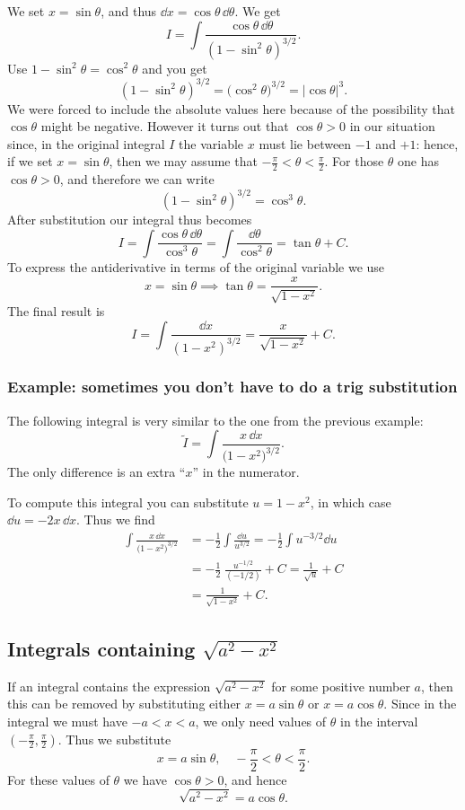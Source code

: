 We set $x=\sin\theta$, and thus $\dd x=\cos \theta\, \dd\theta$.  We get
\[
I = \int\frac{\cos \theta \, \dd\theta}{(1-\sin^2\theta)^{3/2}}.
\]
Use $1-\sin^2\theta = \cos^2 \theta$ and you get
\[
(1-\sin^2\theta)^{3/2} = \bigl(\cos^2\theta\bigr)^{3/2} = |\cos \theta|^3.
\]
We were forced to include the absolute values here because of the possibility
that $\cos\theta$ might be negative.  However it turns out that $\cos \theta>0$
in our situation since, in the original integral $I$ the variable $x$ must lie
between $-1$ and $+1$: hence, if we set $x=\sin\theta$, then we may assume that
$-\frac\pi2 < \theta < \frac\pi2$.  For those $\theta$ one has $\cos \theta>0$,
and therefore we can write
\[
(1-\sin^2\theta)^{3/2} = \cos^3 \theta.
\]
After substitution our integral thus becomes
\[
I = \int \frac{\cos \theta \, \dd\theta}{\cos^3\theta}
=\int\frac{\dd\theta}{\cos^2\theta} = \tan\theta+C.
\]
To express the antiderivative in terms of the original variable we use
\[
x=\sin\theta \implies \tan\theta = \frac{x}{\sqrt{1-x^2}}.
\]
The final result is
\[
I = \int \frac{\dd x}{(1-x^2)^{3/2}} = \frac{x}{\sqrt{1-x^2}} + C.
\]

\subsubsection{Example: sometimes you don't have to do a trig substitution}
The following integral is very similar to the one from the previous example:
\[
\tilde I = \int \frac{x\,\dd x}{\bigl(1-x^2\bigr)^{3/2}}.
\]
The only difference is an extra ``$x$'' in the numerator.

To compute this integral you can substitute $u=1-x^2$, in which case $\dd
u=-2x\,\dd x$.  Thus we find
\begin{align*}
  \int \frac{x\,\dd x}{\bigl(1-x^2\bigr)^{3/2}}
  &= -\frac12 \int \frac{\dd u}{u^{3/2}} = -\frac12 \int u^{-3/2} \dd u\\
  &= -\frac12 \; \frac{u^{-1/2}}{(-1/2)} +C = \frac{1}{\sqrt{u}} + C\\
  &= \frac{1}{\sqrt{1-x^2}} + C.
\end{align*}

\subsection{Integrals containing $\sqrt{a^2-x^2}$} %
If an integral contains the expression $\sqrt{a^2-x^2}$ for some positive number
$a$, then this can be removed by substituting either $x=a\sin \theta$ or
$x=a\cos\theta$.  Since in the integral we must have $-a<x<a$, we only need
values of $\theta$ in the interval $(-\frac\pi2, \frac\pi2)$.  Thus we
substitute
\[
x=a \sin \theta, \quad -\frac{\pi}{2} <\theta < \frac{\pi}{2}.
\]
For these values of $\theta$ we have $\cos\theta >0 $, and hence
\[
\sqrt{a^2-x^2} = a \cos\theta.
\]
